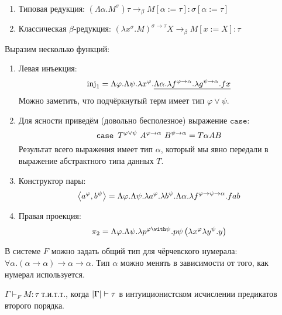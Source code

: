 \begin{definition} \ 
    \begin{enumerate}
        \item Типовая редукция: $\left(\Lambda \alpha . M^\sigma\right) \tau \to_\beta M[\alpha:=\tau] : \sigma[\alpha := \tau]$
        \item Классическая $\beta$-редукция: $\left(\lambda x^\sigma.M\right)^{\sigma\to\tau} X \to_\beta M [x:=X] : \tau$
    \end{enumerate}
\end{definition}

Выразим несколько функций:
\begin{enumerate}
    \item Левая инъекция:
    \[
        \operatorname{inj}_1 = \Lambda \varphi . \Lambda \psi . \lambda x^\varphi .
            \underline{\Lambda \alpha . \lambda f^{\varphi\to\alpha}.\lambda g^{\psi\to\alpha}.f x}
    \]
    Можно заметить, что подчёркнутый терм имеет тип $\varphi \vee \psi$.
    \item Для ясности приведём (довольно бесполезное) выражение $\mathtt{case}$:
    \[
        \mathinner{\mathtt{case}}~T^{\varphi\vee\psi}~A^{\varphi\to\alpha}~B^{\psi\to\alpha} = T \alpha A B
    \]
    Результат всего выражения имеет тип $\alpha$, который мы явно передали в выражение абстрактного типа данных $T$.
    \item Конструктор пары:
    \[
        \left<a^\varphi, b^\psi\right> = \Lambda \varphi . \Lambda \psi . \lambda a^\varphi . \lambda b^\psi .
            \Lambda \alpha . \lambda f^{\varphi\to\psi\to\alpha} . f a b
    \]
    \item Правая проекция:
    \[
        \pi_2 = \Lambda \varphi . \Lambda \psi . \lambda p^{\varphi \with \psi}.p\psi\left(\lambda x^\varphi\lambda y^\psi.y\right)
    \]
\end{enumerate}

В системе $F$ можно задать общий тип для чёрчевского нумерала: $\forall \alpha.(\alpha\to\alpha)\to\alpha\to\alpha$.
Тип $\alpha$ можно менять в зависимости от того, как нумерал используется.

\begin{theorem}
    $\Gamma \vdash_F M :\tau$ т.и.т.т., когда $\left|\Gamma\right| \vdash \tau$ в интуиционистском исчислении предикатов второго порядка.
\end{theorem}

